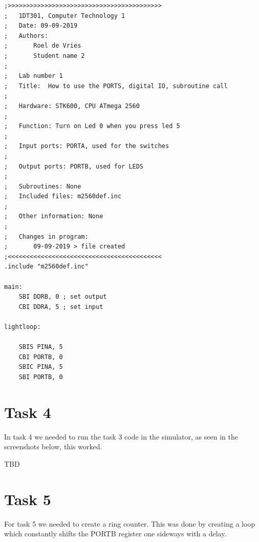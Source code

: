 \documentclass[a4paper,12pt]{article}
\begin{document}
\lstset{style=Asm}

\begin{lstlisting}
;>>>>>>>>>>>>>>>>>>>>>>>>>>>>>>>>>>>>>>>>>>
;	1DT301, Computer Technology 1
;	Date: 09-09-2019
;	Authors:
;		Roel de Vries
;		Student name 2
;
;	Lab number 1
;	Title:	How to use the PORTS, digital IO, subroutine call
;
;	Hardware: STK600, CPU ATmega 2560
;
;	Function: Turn on Led 0 when you press led 5
;
;	Input ports: PORTA, used for the switches
;
;	Output ports: PORTB, used for LEDS
;
;	Subroutines: None
;	Included files: m2560def.inc
;
;	Other information: None
;
;	Changes in program: 
;		09-09-2019 > file created
;<<<<<<<<<<<<<<<<<<<<<<<<<<<<<<<<<<<<<<<<<<
.include "m2560def.inc"

main:
	SBI DDRB, 0 ; set output
	CBI DDRA, 5 ; set input

lightloop:

	SBIS PINA, 5
	CBI PORTB, 0
	SBIC PINA, 5	
	SBI PORTB, 0  
\end{lstlisting}

\section{Task 4}
In task 4 we needed to run the task 3 code in the simulator, as seen in the screenshots below, this worked.

TBD

\section{Task 5}
For task 5 we needed to create a ring counter. This was done by creating a loop which constantly shifts the PORTB register one sideways with a delay.

\lstset{style=Asm}
\end{document}
